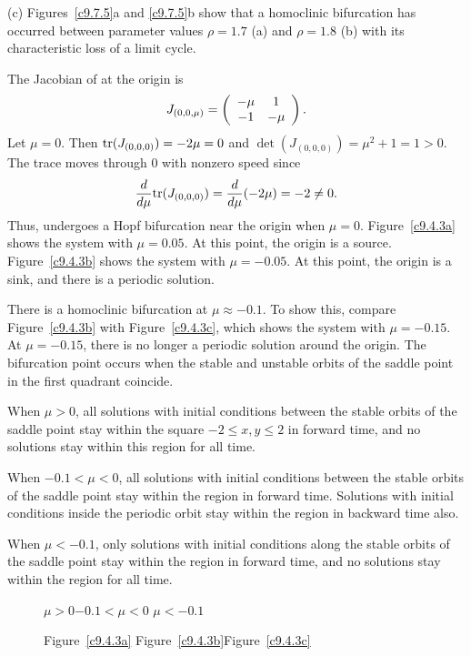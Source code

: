 \documentclass{ximera}
\begin{document}
(c)  Figures~\ref{c9.7.5}a and \ref{c9.7.5}b show that a homoclinic 
bifurcation has occurred between parameter values $\rho=1.7$ (a) and 
$\rho=1.8$ (b) with its characteristic loss of a limit cycle. 

\begin{figure}[htb]
                       \centerline{%
                       }
\end{figure}

The Jacobian of  at the origin is
\[
J_{(0,0,\mu)} = \left(\begin{array}{cc} -\mu & 1\\ -1 &-\mu\end{array}\right).
\]
Let $\mu = 0$.  Then ${\rm tr}(J_{(0,0,0)}) = -2\mu = 0$ and
$\det(J_{(0,0,0)}) = \mu^2 + 1 = 1 > 0$.  The trace moves through $0$ with
nonzero speed since
\[
\frac{d}{d\mu}{\rm tr}(J_{(0,0,0)}) = \frac{d}{d\mu}(-2\mu) = -2 \neq 0.
\]
Thus,  undergoes a Hopf bifurcation near the origin when
$\mu = 0$.  Figure~\ref{c9.4.3a} shows the system with $\mu = 0.05$.  At
this point, the origin is a source.  Figure~\ref{c9.4.3b} shows the
system with $\mu = -0.05$.  At this point, the origin is a sink, and there
is a periodic solution.

There is a homoclinic bifurcation at $\mu \approx -0.1$.  To show this,
compare Figure~\ref{c9.4.3b} with Figure~\ref{c9.4.3c}, which shows the
system with $\mu = -0.15$.  At $\mu = -0.15$, there is no longer a periodic
solution around the origin.  The bifurcation point occurs when the stable
and unstable orbits of the saddle point in the first quadrant coincide.

When $\mu > 0$, all solutions with initial conditions between the
stable orbits of the saddle point stay within the square $-2 \leq
x,y \leq 2$ in forward time, and no solutions stay within this region
for all time.

\para When $-0.1 < \mu < 0$, all solutions with initial
conditions between the stable orbits of the saddle point stay within the
region in forward time.  Solutions with initial conditions inside the
periodic orbit stay within the region in backward time also.

\para When $\mu < -0.1$, only solutions with initial conditions along the
stable orbits of the saddle point stay within the region in forward time,
and no solutions stay within the region for all time.

\begin{figure}[htb]
                       \centerline{%
                       }
		\centerline{$\mu > 0$\hspace{1.2in}$-0.1 < \mu < 0$
\hspace{1.2in}$\mu < -0.1$}
		\centerline{Figure~\ref{c9.4.3a}\hspace{1.2in}
Figure~\ref{c9.4.3b}\hspace{1.2in}Figure~\ref{c9.4.3c}}
\end{figure}
\end{document}
